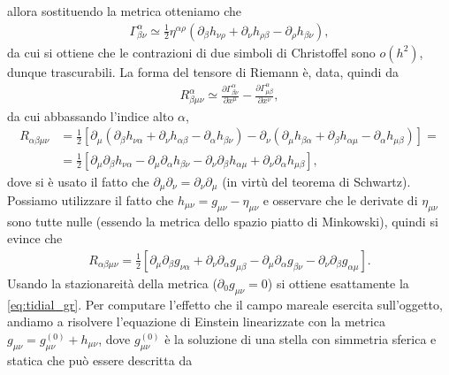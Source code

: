 allora sostituendo la metrica otteniamo che
\begin{align}
	\Gamma^{\alpha}_{\beta \nu} \simeq \frac{1}{2} \eta^{\alpha \rho} \left( \partial_\beta h_{\nu \rho} + \partial_\nu h_{\rho \beta} - \partial_\rho h_{\beta \nu} \right),
\end{align}
da cui si ottiene che le contrazioni di due simboli di Christoffel sono $o(h^2)$, dunque trascurabili. La forma del tensore di Riemann è, data, quindi da
\begin{align}
	R^{\alpha}_{\beta \mu \nu} \simeq \frac{\partial \Gamma^\alpha_{\beta \nu}}{\partial x^\mu} - \frac{\partial \Gamma^\alpha_{\mu \beta}}{\partial x^\nu}, 
\end{align}
da cui abbassando l'indice alto $\alpha$,
\begin{equation}
	\begin{split}
	R_{\alpha \beta \mu \nu} &= \frac12 \left[ \partial_\mu( \partial_\beta h_{\nu \alpha} + \partial_\nu h_{\alpha \beta} - \partial_\alpha h_{\beta \nu}) - \partial_\nu (\partial_\mu h_{\beta \alpha} + \partial_\beta h_{\alpha \mu} - \partial_\alpha h_{\mu \beta}) \right] = \\
				 &= \frac12 \left[ \partial_\mu \partial_\beta h_{\nu \alpha} - \partial_\mu \partial_\alpha h_{\beta \nu} - \partial_\nu \partial_\beta h_{\alpha \mu} + \partial_\nu \partial_\alpha h_{\mu \beta} \right],
	\end{split}
\end{equation}
dove si è usato il fatto che $\partial_\mu \partial_\nu = \partial_\nu \partial_\mu$ (in virtù del teorema di Schwartz). Possiamo utilizzare il fatto che $h_{\mu \nu} = g_{\mu \nu} - \eta_{\mu\nu}$ e osservare che le derivate di $\eta_{\mu \nu}$ sono tutte nulle (essendo la metrica dello spazio piatto di Minkowski), quindi si evince che 
\begin{align}
	R_{\alpha \beta \mu \nu} = \frac12 \left[ \partial_\mu \partial_\beta g_{\nu \alpha} + \partial_\nu \partial_\alpha g_{\mu \beta} - \partial_\mu \partial_\alpha g_{\beta \nu} - \partial_\nu \partial_\beta g_{\alpha \mu} \right].
\end{align}
Usando la stazionareità della metrica ($\partial_0 g_{\mu \nu} = 0$) si ottiene esattamente la \eqref{eq:tidial_gr}. Per computare l'effetto che il campo mareale esercita sull'oggetto, andiamo a risolvere l'equazione di Einstein linearizzate con la metrica $g_{\mu \nu} = g_{\mu \nu}^{(0)} + h_{\mu \nu}$, dove $g_{\mu \nu}^{(0)}$ è la soluzione di una stella con simmetria sferica e statica che può essere descritta da
